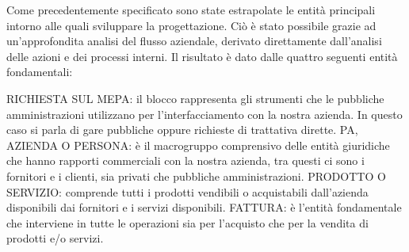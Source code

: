 Come precedentemente specificato sono state estrapolate le entità principali intorno alle quali sviluppare la progettazione. Ciò è stato possibile grazie ad un'approfondita analisi del flusso aziendale, derivato direttamente dall'analisi delle azioni e dei processi interni.\newline
Il risultato è dato dalle quattro seguenti entità fondamentali: \newline

\noindent{}
\newline
\newline
RICHIESTA SUL MEPA: il blocco rappresenta gli strumenti che le pubbliche amministrazioni utilizzano per  l'interfacciamento con la nostra azienda. In questo caso si parla di gare pubbliche oppure richieste di trattativa dirette. \newline
PA, AZIENDA O PERSONA: è il macrogruppo comprensivo delle entità giuridiche che hanno rapporti commerciali con la nostra azienda, tra questi ci sono i fornitori e i clienti, sia privati che pubbliche amministrazioni.\newline
PRODOTTO O SERVIZIO: comprende tutti i prodotti vendibili o acquistabili dall'azienda disponibili dai fornitori e i servizi disponibili.\newline
FATTURA: è l'entità fondamentale che interviene in tutte le operazioni sia per l'acquisto che per la vendita di prodotti e/o servizi.

\newpage
